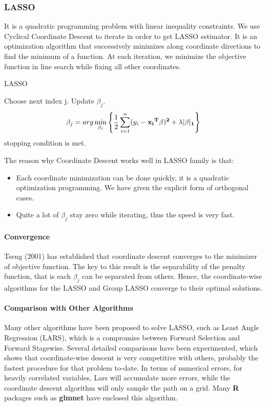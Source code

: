 \documentclass[]{article}
\begin{document}
\subsubsection{LASSO}
It is a quadratic programming problem with linear inequality constraints. We use Cyclical Coordinate Descent\cite{friedman2010regularization} to iterate in order to get LASSO estimator. It is an optimization algorithm that successively minimizes along coordinate directions to find the minimum of a function. At each iteration, we minimize the objective function in line search while fixing all other coordinates.
\begin{algorithm}  
	\caption{LASSO}  
	\begin{algorithmic}[1] %
		\Repeat
		\State Choose next index j.
		\State Update $ \beta_j $.
		\State \begin{equation*}
		\beta_j =arg\min \limits_{\beta_j} \left\{\frac{1}{2}\sum_{i=1}^n (y_i-\bf{x_i}^T\beta)^2+\lambda|\beta|_1\right\} 
		\end{equation*}
		\Until stopping condition is met.
	\end{algorithmic}
\end{algorithm} 

The reason why Coordinate Descent works well in LASSO family is that:
\begin{itemize}
	\item Each coordinate minimization can be done quickly, it is a quadratic optimization programming. We have given the explicit form of orthogonal cases.
	\item Quite a lot of $ \beta_j $ stay zero while iterating, thus the speed is very fast.
\end{itemize}

\paragraph{Convergence}
Tseng (2001) has established that coordinate descent converges to the minimizer of objective function\cite{tseng2001convergence}. The key to this result is the separability of the penalty function, that is each $ \beta_j $ can be separated from others. Hence, the coordinate-wise algorithms for the LASSO and Group LASSO converge to their optimal solutions.
\paragraph{Comparison with Other Algorithms}
Many other algorithms have been proposed to solve LASSO, such as Least Angle Regression (LARS)\cite{efron2004least}, which is a compromise between Forward Selection and Forward Stagewise. Several detailed comparisons have been experimented\cite{friedman2007pathwise}, which shows that coordinate-wise descent is very competitive with others, probably the fastest procedure for that problem to-date. In terms of numerical errors, for heavily correlated variables, Lars will accumulate more errors, while the coordinate descent algorithm will only sample the path on a grid. Many \textbf{R} packages such as \textbf{glmnet} have enclosed this algorithm.
\end{document}
